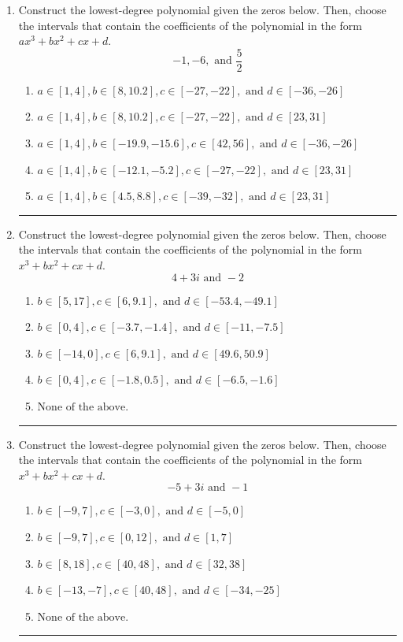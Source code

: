 \documentclass[14pt]{extbook}
\newcommand{\litem}[1]{\item#1\hspace*{-1cm}\rule{\textwidth}{0.4pt}}
\begin{document}
\begin{enumerate}
\litem{
Construct the lowest-degree polynomial given the zeros below. Then, choose the intervals that contain the coefficients of the polynomial in the form $ax^3+bx^2+cx+d$.\[ -1, -6, \text{ and } \frac{5}{2} \]\begin{enumerate}[label=\Alph*.]
\item \( a \in [1, 4], b \in [8, 10.2], c \in [-27, -22], \text{ and } d \in [-36, -26] \)
\item \( a \in [1, 4], b \in [8, 10.2], c \in [-27, -22], \text{ and } d \in [23, 31] \)
\item \( a \in [1, 4], b \in [-19.9, -15.6], c \in [42, 56], \text{ and } d \in [-36, -26] \)
\item \( a \in [1, 4], b \in [-12.1, -5.2], c \in [-27, -22], \text{ and } d \in [23, 31] \)
\item \( a \in [1, 4], b \in [4.5, 8.8], c \in [-39, -32], \text{ and } d \in [23, 31] \)

\end{enumerate} }
\litem{
Construct the lowest-degree polynomial given the zeros below. Then, choose the intervals that contain the coefficients of the polynomial in the form $x^3+bx^2+cx+d$.\[ 4 + 3 i \text{ and } -2 \]\begin{enumerate}[label=\Alph*.]
\item \( b \in [5, 17], c \in [6, 9.1], \text{ and } d \in [-53.4, -49.1] \)
\item \( b \in [0, 4], c \in [-3.7, -1.4], \text{ and } d \in [-11, -7.5] \)
\item \( b \in [-14, 0], c \in [6, 9.1], \text{ and } d \in [49.6, 50.9] \)
\item \( b \in [0, 4], c \in [-1.8, 0.5], \text{ and } d \in [-6.5, -1.6] \)
\item \( \text{None of the above.} \)

\end{enumerate} }
\litem{
Construct the lowest-degree polynomial given the zeros below. Then, choose the intervals that contain the coefficients of the polynomial in the form $x^3+bx^2+cx+d$.\[ -5 + 3 i \text{ and } -1 \]\begin{enumerate}[label=\Alph*.]
\item \( b \in [-9, 7], c \in [-3, 0], \text{ and } d \in [-5, 0] \)
\item \( b \in [-9, 7], c \in [0, 12], \text{ and } d \in [1, 7] \)
\item \( b \in [8, 18], c \in [40, 48], \text{ and } d \in [32, 38] \)
\item \( b \in [-13, -7], c \in [40, 48], \text{ and } d \in [-34, -25] \)
\item \( \text{None of the above.} \)


\end{enumerate}}
\end{enumerate}
\end{document}
